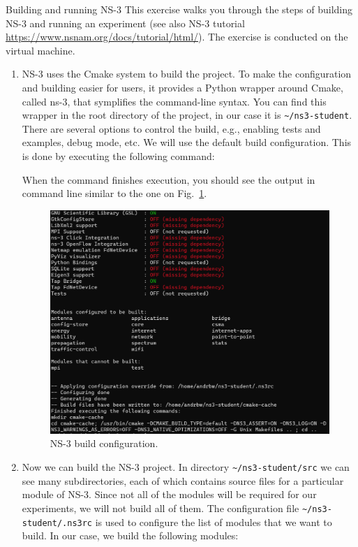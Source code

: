 \begin{exercise}{Building and running NS-3}
This exercise walks you through the steps of building NS-3 and running an experiment (see also NS-3 tutorial \url{https://www.nsnam.org/docs/tutorial/html/}). The exercise is conducted on the virtual machine.

\begin{enumerate}
	\item NS-3 uses the Cmake system to build the project. To make the configuration and building easier for users, it provides a Python wrapper around Cmake, called ns-3, that symplifies the command-line syntax. You can find this wrapper in the root directory of the project, in our case it is \nolinkurl{~/ns3-student}. There are several options to control the build, e.g., enabling tests and examples, debug mode, etc. We will use the default build configuration. This is done by executing the following command:
	\begin{cmdblock}[gobble=2]
	\end{cmdblock}
	When the command finishes execution, you should see the output in command line similar to the one on Fig.~\ref{fig:lab7-ns3-configure}.
	\begin{figure}[ht]
		\centering
		\includegraphics[width=0.8\linewidth]{graphics/ns3-configure}	
		\caption{NS-3 build configuration.}
		\label{fig:lab7-ns3-configure}
	\end{figure}

	\item Now we can build the NS-3 project. In directory \nolinkurl{~/ns3-student/src} we can see many subdirectories, each of which contains source files for a particular module of NS-3. Since not all of the modules will be required for our experiments, we will not build all of them. The configuration file \nolinkurl{~/ns3-student/.ns3rc} is used to configure the list of modules that we want to build. In our case, we build the following modules: 
	

\end{enumerate}
\end{exercise}
